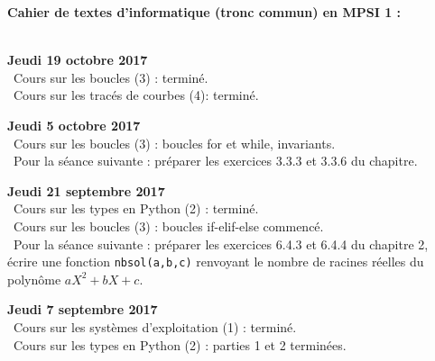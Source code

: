 \documentclass[12pt,a4paper]{article}
\begin{document}
\begin{center}
\Large\bf Cahier de textes d'informatique (tronc commun) en MPSI 1 :
\end{center}
\vspace{1cm}
\vspace{.4cm}\\

\noindent\textbf{Jeudi 19 octobre 2017}\\
\bu\ Cours sur les boucles (3) : terminé. \\
\bu\ Cours sur les tracés de courbes (4): terminé. \\
\vspace{.4cm}

\noindent\textbf{Jeudi 5 octobre 2017}\\
\bu\ Cours sur les boucles (3) : boucles for et while, invariants. \\
\bu\ Pour la séance suivante : préparer les exercices 3.3.3 et 3.3.6 du chapitre.\\
\vspace{.4cm}

\noindent\textbf{Jeudi 21 septembre 2017}\\
\bu\ Cours sur les types en Python (2) : terminé. \\
\bu\ Cours sur les boucles (3) : boucles if-elif-else commencé. \\
\bu\ Pour la séance suivante : préparer les exercices 6.4.3 et 6.4.4 du chapitre 2, écrire une fonction \texttt{nbsol(a,b,c)} renvoyant le nombre de racines réelles du polynôme $aX^2+bX+c$.\\
\vspace{.4cm}

\noindent\textbf{Jeudi 7 septembre 2017}\\
\bu\ Cours sur les systèmes d'exploitation (1) : terminé.  \\
\bu\ Cours sur les types en Python (2) : parties 1 et 2 terminées. \\
\vspace{.4cm}

\label{end}
\end{document}

